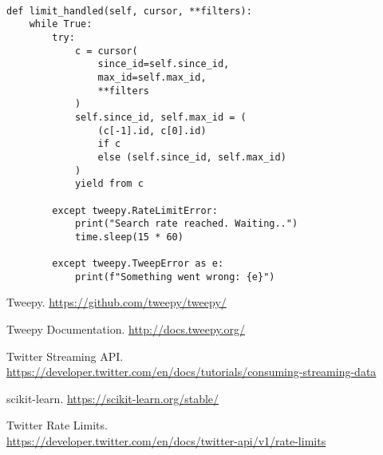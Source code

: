 \documentclass{article}
\begin{document}
\begin{verbatim}

def limit_handled(self, cursor, **filters):
    while True:
        try:
            c = cursor(
                since_id=self.since_id,
                max_id=self.max_id,
                **filters
            )
            self.since_id, self.max_id = (
                (c[-1].id, c[0].id)
                if c
                else (self.since_id, self.max_id)
            )
            yield from c

        except tweepy.RateLimitError:
            print("Search rate reached. Waiting..")
            time.sleep(15 * 60)

        except tweepy.TweepError as e:
            print(f"Something went wrong: {e}")

\end{verbatim}

\begin{thebibliography}{9}

Tweepy. \href{https://github.com/tweepy/tweepy/}{https://github.com/tweepy/tweepy/}

Tweepy Documentation. \href{http://docs.tweepy.org/}{http://docs.tweepy.org/}

Twitter Streaming API.\\ \href{https://developer.twitter.com/en/docs/tutorials/consuming-streaming-data}{https://developer.twitter.com/en/docs/tutorials/consuming-streaming-data}

scikit-learn. \href{https://scikit-learn.org/stable/}{https://scikit-learn.org/stable/}

Twitter Rate Limits.\\ \href{https://developer.twitter.com/en/docs/twitter-api/v1/rate-limits}{https://developer.twitter.com/en/docs/twitter-api/v1/rate-limits}
\end{thebibliography}
\end{document}
